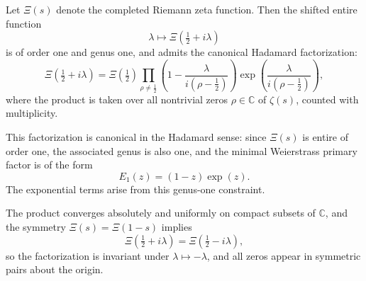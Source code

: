 \begin{lemma}
\label{lem:hadamard_linear_form}
Let \( \Xi(s) \) denote the completed Riemann zeta function. Then the shifted entire function
\[
\lambda \mapsto \Xi\left( \tfrac{1}{2} + i\lambda \right)
\]
is of order one and genus one, and admits the canonical Hadamard factorization:
\[
\Xi\left( \tfrac{1}{2} + i\lambda \right)
= \Xi\left( \tfrac{1}{2} \right)
\prod_{\rho \ne \tfrac{1}{2}} \left( 1 - \frac{\lambda}{i(\rho - \tfrac{1}{2})} \right)
\exp\left( \frac{\lambda}{i(\rho - \tfrac{1}{2})} \right),
\]
where the product is taken over all nontrivial zeros \( \rho \in \mathbb{C} \) of \( \zeta(s) \), counted with multiplicity.

\medskip
\noindent
This factorization is canonical in the Hadamard sense: since \( \Xi(s) \) is entire of order one, the associated genus is also one, and the minimal Weierstrass primary factor is of the form
\[
E_1(z) = (1 - z) \exp(z).
\]
The exponential terms arise from this genus-one constraint.

\medskip
\noindent
The product converges absolutely and uniformly on compact subsets of \( \mathbb{C} \), and the symmetry \( \Xi(s) = \Xi(1 - s) \) implies
\[
\Xi\left( \tfrac{1}{2} + i\lambda \right) = \Xi\left( \tfrac{1}{2} - i\lambda \right),
\]
so the factorization is invariant under \( \lambda \mapsto -\lambda \), and all zeros appear in symmetric pairs about the origin.
\end{lemma}
%  